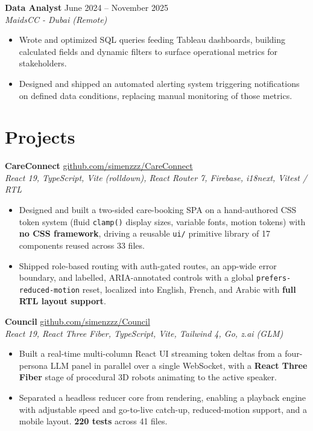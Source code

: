 \documentclass[11pt, a4paper]{article}
\begin{document}
\textbf{Data Analyst} \hfill June 2024 -- November 2025 \\
\textit{MaidsCC - Dubai (Remote)}

\begin{itemize}
  \item Wrote and optimized SQL queries feeding Tableau dashboards, building
        calculated fields and dynamic filters to surface operational metrics for
        stakeholders.
  \item Designed and shipped an automated alerting system triggering notifications
        on defined data conditions, replacing manual monitoring of those metrics.
\end{itemize}

\section{Projects}

\textbf{CareConnect} \hfill
  \href{https://github.com/simenzzz/CareConnect}{github.com/simenzzz/CareConnect} \\
\textit{React 19, TypeScript, Vite (rolldown), React Router 7, Firebase, i18next, Vitest / RTL}
\begin{itemize}
  \item Designed and built a two-sided care-booking SPA on a hand-authored CSS
        token system (fluid \texttt{clamp()} display sizes, variable fonts, motion
        tokens) with \textbf{no CSS framework}, driving a reusable \texttt{ui/}
        primitive library of 17 components reused across 33 files.
  \item Shipped role-based routing with auth-gated routes, an app-wide error
        boundary, and labelled, ARIA-annotated controls with a global
        \texttt{prefers-reduced-motion} reset, localized into English, French, and
        Arabic with \textbf{full RTL layout support}.
\end{itemize}

\medskip

\textbf{Council} \hfill
  \href{https://github.com/simenzzz/Council}{github.com/simenzzz/Council} \\
\textit{React 19, React Three Fiber, TypeScript, Vite, Tailwind 4, Go, z.ai (GLM)}
\begin{itemize}
  \item Built a real-time multi-column React UI streaming token deltas from a
        four-persona LLM panel in parallel over a single WebSocket, with a
        \textbf{React Three Fiber} stage of procedural 3D robots animating to the
        active speaker.
  \item Separated a headless reducer core from rendering, enabling a playback
        engine with adjustable speed and go-to-live catch-up, reduced-motion
        support, and a mobile layout. \textbf{220 tests} across 41 files.
\end{itemize}
\end{document}
